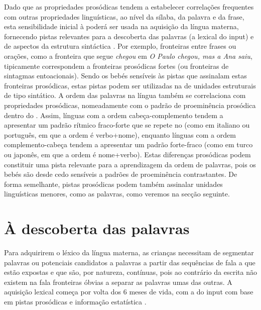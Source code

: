 \documentclass[output=paper]{LSP/langsci}
\begin{document}
Dado que as propriedades prosódicas tendem a estabelecer correlações frequentes com outras propriedades linguísticas, ao nível da sílaba, da palavra e da frase, esta sensibilidade inicial à  poderá ser usada na aquisição da língua materna, fornecendo pistas relevantes para a descoberta das palavras (a  lexical do input) e de aspectos da estrutura sintáctica \citep[a segmentação de unidades linguísticas maiores, de tipo sintagmático e frásico -- ver, entre outros,][]{morgandemuth1996,hohle2009}. Por exemplo, fronteiras entre frases ou orações, como a fronteira que segue \textit{chegou} em \textit{O Paulo chegou, mas a Ana saiu}, tipicamente correspondem a fronteiras prosódicas fortes (ou fronteiras de sintagmas entoacionais).  Sendo os bebés sensíveis às pistas que assinalam estas fronteiras prosódicas, estas pistas podem ser utilizadas na  de unidades estruturais de tipo sintático. A ordem das palavras na língua também se correlaciona com propriedades prosódicas, nomeadamente com o padrão de proeminência prosódica dentro do . Assim, línguas com a ordem cabeça-complemento tendem a apresentar um padrão rítmico fraco-forte que se repete no  (como em italiano ou português, em que a ordem é verbo+nome), enquanto línguas com a ordem complemento-cabeça tendem a apresentar um padrão forte-fraco (como em turco ou japonês, em que a ordem é nome+verbo). Estas diferenças prosódicas podem constituir uma pista relevante para a aprendizagem da ordem de palavras, pois os bebés são desde cedo sensíveis a padrões de proeminência contrastantes. De forma semelhante, pistas prosódicas podem também assinalar unidades linguísticas menores, como as palavras, como veremos na secção seguinte.

\section{À descoberta das palavras}
\label{sec:frota_descoberta}

Para adquirirem o léxico da língua materna, as crianças necessitam de segmentar palavras ou potenciais candidatos a palavras a partir das sequências de fala a que estão expostas e que são, por natureza, contínuas, pois ao contrário da escrita não existem na fala fronteiras óbvias a separar as palavras umas das outras. A aquisição lexical começa por volta dos 6 meses de vida, com a  do input com base em pistas prosódicas e informação estatística \citep{gervainmehler2010}.
\end{document}
